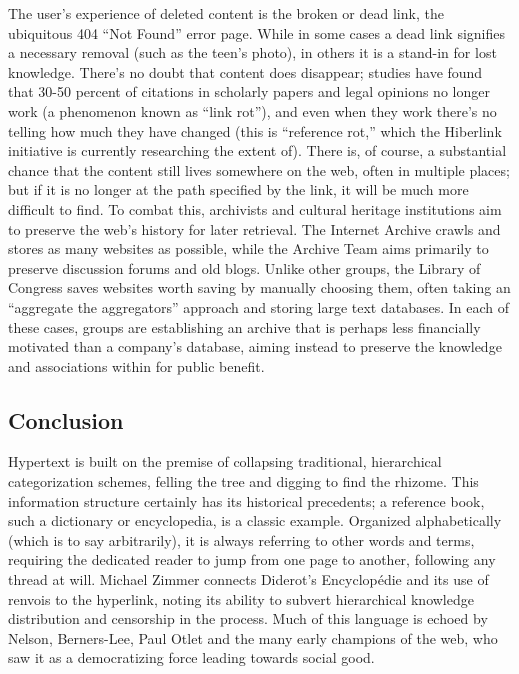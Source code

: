 The user’s experience of deleted content is the broken or dead link, the ubiquitous 404 “Not Found” error page. While in some cases a dead link signifies a necessary removal (such as the teen’s photo), in others it is a stand-in for lost knowledge. There’s no doubt that content does disappear; studies have found that 30-50 percent of citations in scholarly papers and legal opinions no longer work (a phenomenon known as “link rot”), and even when they work there’s no telling how much they have changed (this is “reference rot,” which the Hiberlink initiative is currently researching the extent of).  There is, of course, a substantial chance that the content still lives somewhere on the web, often in multiple places; but if it is no longer at the path specified by the link, it will be much more difficult to find. To combat this, archivists and cultural heritage institutions aim to preserve the web’s history for later retrieval. The Internet Archive crawls and stores as many websites as possible, while the Archive Team aims primarily to preserve discussion forums and old blogs. Unlike other groups, the Library of Congress saves websites worth saving by manually choosing them, often taking an “aggregate the aggregators” approach and storing large text databases. In each of these cases, groups are establishing an archive that is perhaps less financially motivated than a company’s database, aiming instead to preserve the knowledge and associations within for public benefit.

\subsection{Conclusion}

Hypertext is built on the premise of collapsing traditional, hierarchical categorization schemes, felling the tree and digging to find the rhizome. This information structure certainly has its historical precedents; a reference book, such a dictionary or encyclopedia, is a classic example. Organized alphabetically (which is to say arbitrarily), it is always referring to other words and terms, requiring the dedicated reader to jump from one page to another, following any thread at will. Michael Zimmer connects Diderot’s Encyclopédie and its use of renvois to the hyperlink, noting its ability to subvert hierarchical knowledge distribution and censorship in the process.  Much of this language is echoed by Nelson, Berners-Lee, Paul Otlet and the many early champions of the web, who saw it as a democratizing force leading towards social good.

